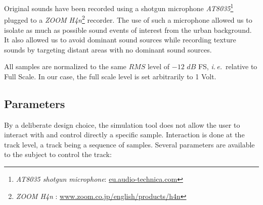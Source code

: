 \documentclass[12pt]{elsarticle}
\newcommand{\ie}{\emph{i.\,e.}}
\begin{document}
Original sounds have been recorded using a shotgun microphone \emph{AT8035}\footnote{\emph{AT8035 shotgun microphone}: \url{eu.audio-technica.com}} plugged to a \emph{ZOOM H4n}\footnote{\emph{ZOOM H4n} : \url{www.zoom.co.jp/english/products/h4n}} recorder. The use of such a microphone allowed us to isolate as much as possible sound events of interest from the urban background. It also allowed us to avoid dominant sound sources while recording texture sounds by targeting distant areas with no dominant sound sources.


All samples are normalized to the same $RMS$ level of $-12$ $dB$ FS, \ie~relative to Full Scale. In our case, the full scale level is set arbitrarily to 1 Volt.

\subsection{Parameters}
\label{sec:simscene_parametre}


By a deliberate design choice, the simulation tool does not allow the user to interact with and control directly a specific sample. Interaction is done at the track level, a track being a sequence of samples. Several parameters are available to the subject to control the track:

\end{document}
